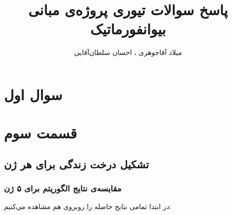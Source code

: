 \documentclass[11pt]{article}
\title{پاسخ سوالات تیوری پروژه‌ی مبانی بیو‌انفورماتیک}
\author{میلاد آقاجوهری ، احسان سلطان‌آقایی}
\begin{document}
\maketitle
\section{سوال اول}
\section{قسمت سوم}
\subsection{تشکیل درخت زندگی برای هر ژن}
\subsubsection{مقایسه‌ی نتایج الگوریتم برای ۵ ژن}
در ابتدا تمامی نتایج حاصله را روبروی هم مشاهده می‌کنیم:
\end{document}
